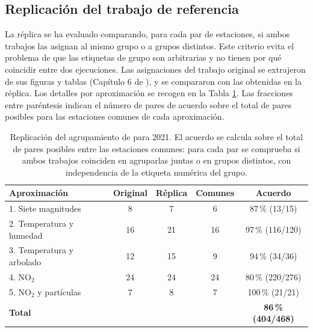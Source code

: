\subsection{Replicación del trabajo de referencia}
\label{sec:Resultados_replica}

La réplica se ha evaluado comparando, para cada par de estaciones, si ambos trabajos las asignan al mismo grupo o a grupos distintos. Este criterio evita el problema de que las etiquetas de grupo son arbitrarias y no tienen por qué coincidir entre dos ejecuciones. Las asignaciones del trabajo original se extrajeron de sus figuras y tablas (Capítulo 6 de \citep{Meneses2023Madrid}), y se compararon con las obtenidas en la réplica. Los detalles por aproximación se recogen en la Tabla \ref{tab:replica_clusters}. Las fracciones entre paréntesis indican el número de pares de acuerdo sobre el total de pares posibles para las estaciones comunes de cada aproximación.

\begin{table}[htbp]
	\centering
	\small
	\setlength{\tabcolsep}{4pt}
	\renewcommand{\arraystretch}{1.2}
	\begin{tabular}{p{4.2cm}cccc}
		\hline
		\textbf{Aproximación} & \textbf{Original} & \textbf{Réplica} & \textbf{Comunes} & \textbf{Acuerdo} \\
		\hline
		1. Siete magnitudes & 8 & 7 & 6 & 87\,\% (13/15) \\
		2. Temperatura y humedad & 16 & 21 & 16 & 97\,\% (116/120) \\
		3. Temperatura y arbolado & 12 & 15 & 9 & 94\,\% (34/36) \\
		4. NO$_2$ & 24 & 24 & 24 & 80\,\% (220/276) \\
		5. NO$_2$ y partículas & 7 & 8 & 7 & 100\,\% (21/21) \\
		\hline
		\textbf{Total} & & & & \textbf{86\,\% (404/468)} \\
		\hline
	\end{tabular}
	\caption{Replicación del agrupamiento de \citep{Meneses2023Madrid} para 2021. El acuerdo se calcula sobre el total de pares posibles entre las estaciones comunes: para cada par se comprueba si ambos trabajos coinciden en agruparlas juntas o en grupos distintos, con independencia de la etiqueta numérica del grupo.}
	\label{tab:replica_clusters}
\end{table}


